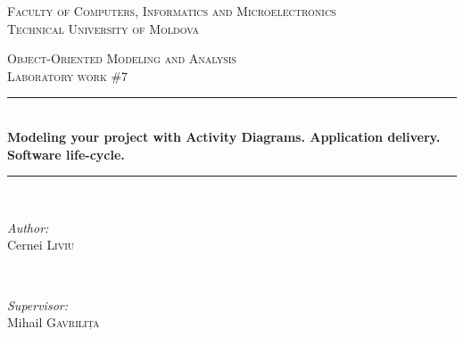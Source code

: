 \documentclass[12pt,a4paper,titlepage]{article}
\begin{document}
\begin{titlepage}

  \begin{center} %

  \textsc{\large Faculty of Computers, Informatics and Microelectronics}\\[0.5cm]
  \textsc{\large Technical University of Moldova}\\[1.2cm] %
  \vspace{25 mm}

  \textsc{\Large Object-Oriented Modeling and Analysis}\\[0.5cm] %
  \textsc{\large Laboratory work \#7}\\[0.5cm] %

\newcommand{\HRule}{\rule{\linewidth}{0.5mm}} %

  \vspace{10 mm}
  \HRule \\[0.4cm]
  { \LARGE \bfseries Modeling your project with Activity Diagrams. Application delivery. Software life-cycle. }\\[0.4cm] %
  \HRule \\[1.5cm]

      \vspace{30mm}

      \begin{minipage}{0.4\textwidth}
      \begin{flushleft} \large
      \emph{Author:}\\
      Cernei \textsc{Liviu}
      \end{flushleft}
      \end{minipage}
      ~
      \begin{minipage}{0.4\textwidth}
      \begin{flushright} \large
      \emph{Supervisor:} \\
      Mihail \textsc{Gavrilița} %
      \end{flushright}
      \end{minipage}\\[4cm]


\end{center}
\end{titlepage}
\end{document}

